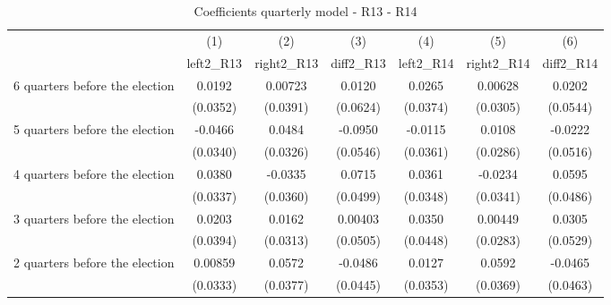\begin{table}[!ht]\centering \footnotesize
\def\sym#1{\ifmmode^{#1}\else\(^{#1}\)\fi}
\caption{Coefficients quarterly model - R13 - R14}
\begin{tabular}{l*{6}{c}}
\hline\hline
                    &\multicolumn{1}{c}{(1)}&\multicolumn{1}{c}{(2)}&\multicolumn{1}{c}{(3)}&\multicolumn{1}{c}{(4)}&\multicolumn{1}{c}{(5)}&\multicolumn{1}{c}{(6)}\\
                    &\multicolumn{1}{c}{left2\_R13}&\multicolumn{1}{c}{right2\_R13}&\multicolumn{1}{c}{diff2\_R13}&\multicolumn{1}{c}{left2\_R14}&\multicolumn{1}{c}{right2\_R14}&\multicolumn{1}{c}{diff2\_R14}\\
\hline
 6 quarters before the election&      0.0192         &     0.00723         &      0.0120         &      0.0265         &     0.00628         &      0.0202         \\
                    &    (0.0352)         &    (0.0391)         &    (0.0624)         &    (0.0374)         &    (0.0305)         &    (0.0544)         \\
[1em]
 5 quarters before the election&     -0.0466         &      0.0484         &     -0.0950         &     -0.0115         &      0.0108         &     -0.0222         \\
                    &    (0.0340)         &    (0.0326)         &    (0.0546)         &    (0.0361)         &    (0.0286)         &    (0.0516)         \\
[1em]
 4 quarters before the election&      0.0380         &     -0.0335         &      0.0715         &      0.0361         &     -0.0234         &      0.0595         \\
                    &    (0.0337)         &    (0.0360)         &    (0.0499)         &    (0.0348)         &    (0.0341)         &    (0.0486)         \\
[1em]
 3 quarters before the election&      0.0203         &      0.0162         &     0.00403         &      0.0350         &     0.00449         &      0.0305         \\
                    &    (0.0394)         &    (0.0313)         &    (0.0505)         &    (0.0448)         &    (0.0283)         &    (0.0529)         \\
[1em]
 2 quarters before the election&     0.00859         &      0.0572         &     -0.0486         &      0.0127         &      0.0592         &     -0.0465         \\
                    &    (0.0333)         &    (0.0377)         &    (0.0445)         &    (0.0353)         &    (0.0369)         &    (0.0463)         \\

\end{tabular}
\end{table}
